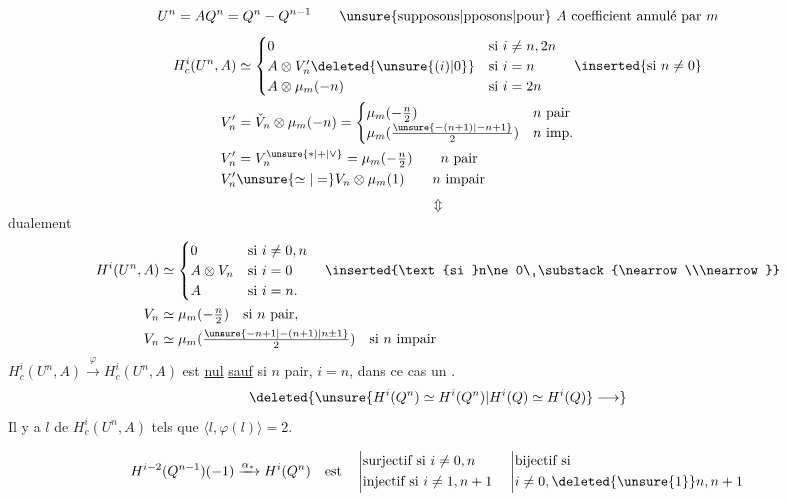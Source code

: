 \[
U^n=AQ^n=Q^n-Q^{n-1}
\qquad\text{\unsure{supposons|pposons|pour} $A$ coefficient annulé par $m$}
\]
\[
\begin{aligned}
H_c^i(U^n,A)&\simeq
\begin{cases}
0&\text{si }i\ne n,2n\\
A\otimes V'_n\deleted{\unsure{(i)|0}}&\text{si }i=n\\
A\otimes\mu_m(-n)&\text{si }i=2n
\end{cases}\quad\inserted{\text{si }n\ne0}\\
V'_n&=\check V_n\otimes\mu_m(-n)=\begin{cases}
\mu_m(-\frac n2)&n\text{ pair}\\
\mu_m(\frac{\unsure{-(n+1)|-n+1}}2)&n\text{ imp.}
\end{cases}\\
V'_n&=V_n^{\unsure{*|+|\vee}}=\mu_m(-\tfrac n2)\qquad n\text{ pair}\\
V'_n&\unsure{\simeq|=} V_n\otimes\mu_m(1)\qquad n\text{ impair}
\end{aligned}
\]
\[
\Updownarrow
\]
dualement
\[
\begin{aligned}
H^i(U^n,A)&\simeq\begin{cases}
0 &\text{si }i\ne0,n\\
A\otimes V_n &\text{si }i=0\\
A &\text{si }i=n.
\end{cases}\quad\inserted{\text{si }n\ne0\ \substack{\nearrow\\\nearrow}}\\
V_n&\simeq\mu_m(-\tfrac n2)\quad\text{si $n$ pair,}\\
V_n&\simeq\mu_m(\tfrac{\unsure{-n+1|-(n+1)|n\pm1}}2)\quad\text{si $n$ impair}
\end{aligned}
\]
$H_c^i(U^n,A)\xrightarrow{\varphi}H_c^i(U^n,A)$ est \uline{nul} \uline{sauf} si $n$ pair, $i=n$, dans ce cas  un  .
\[
\deleted{\unsure{H^i(Q^n)\simeq H^i(Q^n)|H^i(Q)\simeq H^i(Q)}\longrightarrow}
\]
Il y a   $l$ de $H_c^i(U^n,A)$ tels que $\langle l,\varphi(l)\rangle=2$.

\[
H^{i-2}(Q^{n-1})(-1)\xrightarrow{\alpha_*}H^i(Q^n)\quad\text{est}\quad
\left|\begin{aligned}
&\text{surjectif si }i\ne0,n\\
&\text{injectif si }i\ne1,n+1
\end{aligned}\right.
\quad\left|\begin{aligned}&\text{bijectif si}\\&i\ne0,\deleted{\unsure{1}}n,n+1\end{aligned}\right.
\]

